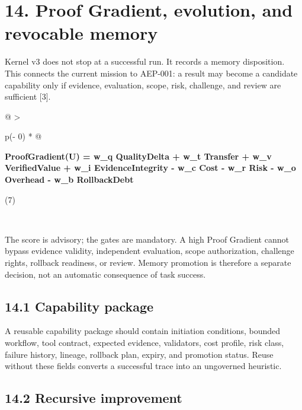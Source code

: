 \section{14. Proof Gradient, evolution, and revocable
memory}\label{proof-gradient-evolution-and-revocable-memory}

Kernel v3 does not stop at a successful run. It records a memory
disposition. This connects the current mission to AEP-001: a result may
become a candidate capability only if evidence, evaluation, scope, risk,
challenge, and review are sufficient {[}3{]}.

\begin{longtable}[]{@{}
  >{\raggedright\arraybackslash}p{(\columnwidth - 0\tabcolsep) * }@{}}
\toprule\noalign{}
\begin{minipage}[b]{\linewidth}\raggedright
\textbf{ProofGradient(U) = w\_\allowbreak{}q QualityDelta + w\_\allowbreak{}t Transfer + w\_\allowbreak{}v
VerifiedValue + w\_\allowbreak{}i EvidenceIntegrity - w\_\allowbreak{}c Cost - w\_\allowbreak{}r Risk - w\_\allowbreak{}o
Overhead - w\_\allowbreak{}b RollbackDebt}

(7)
\end{minipage} \\
\midrule\noalign{}
\endhead
\bottomrule\noalign{}
\endlastfoot
\end{longtable}

The score is advisory; the gates are mandatory. A high Proof Gradient
cannot bypass evidence validity, independent evaluation, scope
authorization, challenge rights, rollback readiness, or review. Memory
promotion is therefore a separate decision, not an automatic consequence
of task success.

\subsection{14.1 Capability package}\label{capability-package}

A reusable capability package should contain initiation conditions,
bounded workflow, tool contract, expected evidence, validators, cost
profile, risk class, failure history, lineage, rollback plan, expiry,
and promotion status. Reuse without these fields converts a successful
trace into an ungoverned heuristic.

\subsection{14.2 Recursive improvement}\label{recursive-improvement}

